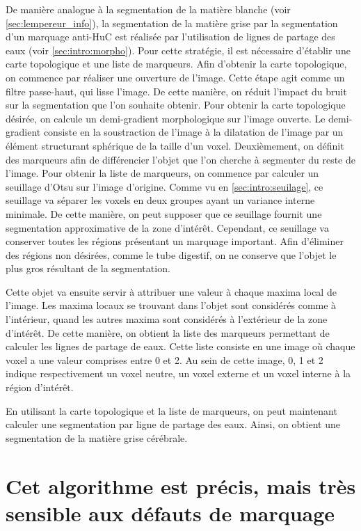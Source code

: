 \documentclass[\main/main.tex]{subfiles}
\begin{document}
De manière analogue à la segmentation de la matière blanche (voir \autoref{sec:lempereur_info}), la segmentation de la matière grise par la segmentation d'un marquage anti-HuC est réalisée par l'utilisation de lignes de partage des eaux
(voir \autoref{sec:intro:morpho}). Pour cette stratégie, il est nécessaire d'établir une carte topologique et une liste de marqueurs.
%
Afin d'obtenir la carte topologique, on commence par réaliser une ouverture de l'image. Cette étape agit comme un filtre passe-haut,
qui lisse l'image. De cette manière, on réduit l'impact du bruit sur la segmentation que l'on souhaite obtenir. Pour obtenir la carte topologique désirée, on calcule un demi-gradient morphologique sur l'image ouverte. Le demi-gradient consiste en la soustraction de l'image à la dilatation de l'image par un élément structurant sphérique de la taille d'un voxel.
Deuxièmement, on définit des marqueurs afin de différencier l'objet que l'on cherche à segmenter du reste de l'image. Pour obtenir la liste de marqueurs, on commence par calculer un seuillage d'Otsu sur l'image d'origine. Comme vu en \autoref{sec:intro:seuilage}, ce seuillage va séparer les voxels en deux groupes ayant un variance interne minimale. De cette manière, on peut supposer que ce seuillage fournit une segmentation approximative de la zone d'intérêt. Cependant, ce seuillage va conserver toutes les régions présentant un marquage important. Afin d'éliminer des régions non désirées, comme le tube digestif, on ne conserve que l'objet le plus gros résultant de la segmentation.

%
Cette objet va ensuite servir à attribuer une valeur à chaque maxima local de l'image. Les maxima locaux se trouvant dans l'objet sont considérés comme à l'intérieur, quand les autres maxima sont considérés à l'extérieur de la zone d'intérêt. De cette manière, on obtient la liste des marqueurs permettant de calculer les lignes de partage de eaux. Cette liste consiste en une image où chaque voxel a une valeur comprises entre 0 et 2. Au sein de cette image, 0, 1 et 2 indique respectivement un voxel neutre, un voxel externe et un voxel interne à la région d'intérêt. 

%
En utilisant la carte topologique et la liste de marqueurs, on peut maintenant calculer une segmentation par ligne de partage des eaux. Ainsi, on obtient une segmentation de la matière grise cérébrale.
    
    \section{Cet algorithme est précis, mais très sensible aux défauts de marquage}
    
\end{document}
